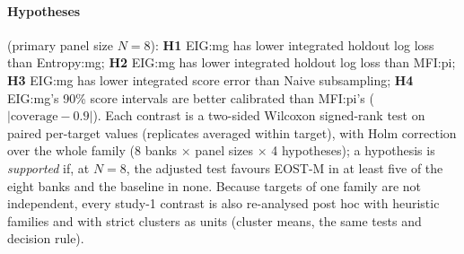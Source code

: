 \paragraph{Hypotheses} (primary panel size $N=8$):
\textbf{H1} EIG:mg has lower integrated holdout log loss than Entropy:mg;
\textbf{H2} EIG:mg has lower integrated holdout log loss than MFI:pi;
\textbf{H3} EIG:mg has lower integrated score error than Naive subsampling;
\textbf{H4} EIG:mg's 90\% score intervals are better calibrated than MFI:pi's
($|\mathrm{coverage}-0.9|$). Each contrast is a two-sided Wilcoxon signed-rank test
\citep{wilcoxon1945individual} on paired per-target values (replicates averaged within
target), with Holm correction \citep{holm1979simple} over the whole family
(8 banks $\times$ panel sizes $\times$ 4 hypotheses); a hypothesis is \emph{supported} if,
at $N=8$, the adjusted test favours EOST-M in at least five of the eight banks and the
baseline in none. Because targets of one family are not independent, every study-1
contrast is also re-analysed post hoc with heuristic families and with strict clusters as
units (cluster means, the same tests and decision rule).

